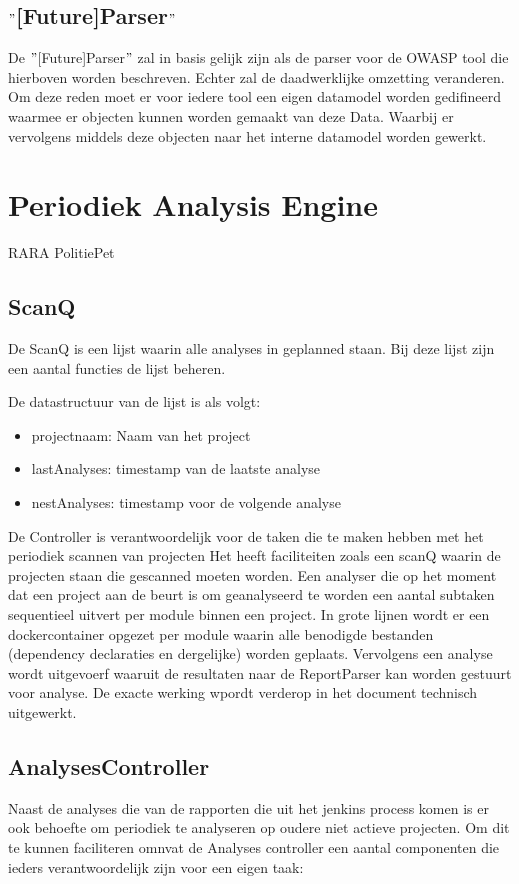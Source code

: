 \subsection{$"$[Future]Parser$"$}\label{subsec:$"$[future]parser$"$}
De $"$[Future]Parser$"$ zal in basis gelijk zijn als de parser voor de OWASP tool die hierboven worden beschreven. Echter zal de daadwerklijke omzetting veranderen. Om deze reden moet er voor iedere tool een eigen datamodel worden gedifineerd waarmee er objecten kunnen worden gemaakt van deze Data. Waarbij er vervolgens middels deze objecten naar het interne datamodel worden gewerkt.

\section{Periodiek Analysis Engine}\label{sec:periodiek-analysis-engine}

RARA PolitiePet



\subsection{ScanQ}
De ScanQ is een lijst waarin alle analyses in geplanned staan. Bij deze lijst zijn een aantal functies de lijst beheren.

De datastructuur van de lijst is als volgt:
\begin{itemize}
    \item projectnaam: Naam van het project
    \item lastAnalyses: timestamp van de laatste analyse
    \item nestAnalyses: timestamp voor de volgende analyse
\end{itemize}
De Controller is verantwoordelijk voor de taken die te maken hebben met het periodiek scannen van projecten Het heeft faciliteiten zoals een scanQ waarin de projecten staan die gescanned moeten worden. Een analyser die op het moment dat een project aan de beurt is om geanalyseerd te worden een aantal subtaken sequentieel uitvert per module binnen een project.
In grote lijnen wordt er een dockercontainer opgezet per module waarin alle benodigde bestanden (dependency declaraties en dergelijke) worden geplaats. Vervolgens een analyse wordt uitgevoerf waaruit de resultaten naar de ReportParser kan worden gestuurt voor analyse. De exacte werking wpordt verderop in het document technisch uitgewerkt.


\subsection{AnalysesController}\label{subsec:controller}
Naast de analyses die van de rapporten die uit het jenkins process komen is er ook behoefte om periodiek te analyseren op oudere niet actieve projecten. Om dit te kunnen faciliteren omnvat de Analyses controller een aantal componenten die ieders verantwoordelijk zijn voor een eigen taak:

